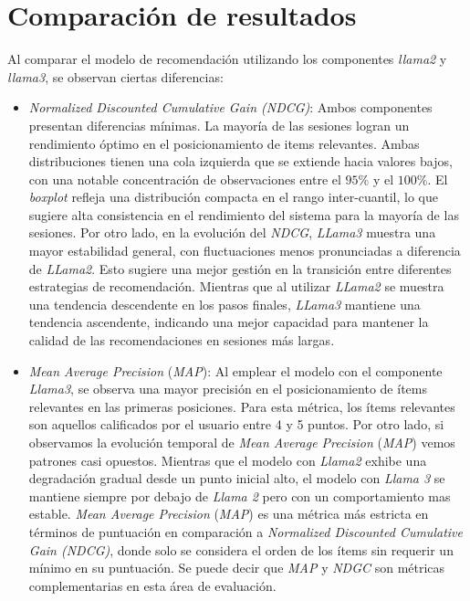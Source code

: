 \documentclass[11pt,a4paper,twoside]{thesis}
\begin{document}
\chapter{Comparación de resultados}

Al comparar el modelo de recomendación utilizando los componentes \textit{llama2} y \textit{llama3}, se observan ciertas diferencias:

\begin{itemize}
	\item \textit{Normalized Discounted Cumulative Gain (NDCG)}: Ambos componentes presentan diferencias mínimas. La mayoría de las sesiones logran un rendimiento óptimo en el posicionamiento de items relevantes. Ambas distribuciones tienen una cola izquierda que se extiende hacia valores bajos, con una notable concentración de observaciones entre el $95\%$ y el $100\%$. El \textit{boxplot} refleja una distribución compacta en el rango inter-cuantil, lo que sugiere alta consistencia en el rendimiento del sistema para la mayoría de las sesiones. Por otro lado, en la evolución del \textit{NDCG}, \textit{LLama3} muestra una mayor estabilidad general, con fluctuaciones menos pronunciadas a diferencia de \textit{LLama2}. Esto sugiere una mejor gestión en la transición entre diferentes estrategias de recomendación. Mientras que al utilizar \textit{LLama2} se muestra una tendencia descendente en los pasos finales, \textit{LLama3} mantiene una tendencia ascendente, indicando una mejor capacidad para mantener la calidad de las recomendaciones en sesiones más largas.

	\item \textit{Mean Average Precision} (\textit{MAP}): Al emplear el modelo con el componente \textit{Llama3}, se observa una mayor precisión en el posicionamiento de ítems relevantes en las primeras posiciones. Para esta métrica, los ítems relevantes son aquellos calificados por el usuario entre 4 y 5 puntos.
	      Por otro lado, si observamos la evolución temporal de \textit{Mean Average Precision} (\textit{MAP}) vemos patrones casi opuestos. Mientras que el modelo con \textit{Llama2} exhibe una degradación gradual desde un punto inicial alto, el modelo con \textit{Llama 3} se mantiene siempre por debajo de \textit{Llama 2} pero con un comportamiento mas estable. \textit{Mean Average Precision} (\textit{MAP}) es una métrica más estricta en términos de puntuación en comparación a \textit{Normalized Discounted Cumulative Gain (NDCG)}, donde solo se considera el orden de los ítems sin requerir un mínimo en su puntuación. Se puede decir que \textit{MAP} y \textit{NDGC} son métricas complementarias en esta área de evaluación.


\end{itemize}
\end{document}
